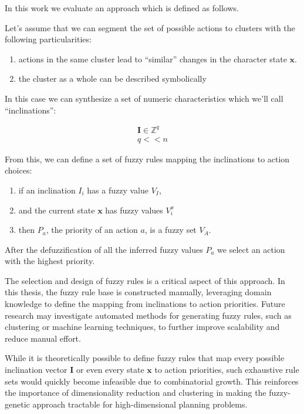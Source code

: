 \documentclass[11pt, a4paper]{article}
\begin{document}
	In this work we evaluate an approach which is defined as follows.
	
	Let's assume that we can segment the set of possible actions to clusters with the following particularities:
	
	\begin{enumerate}
		\item actions in the same cluster lead to ``similar'' changes in the character state $\mathbf{x}$.
		\item the cluster as a whole can be described symbolically
	\end{enumerate}
	
	In this case we can synthesize a set of numeric characteristics which we'll call ``inclinations'':
	
	\begin{eqnarray}
		\mathbf{I} \in \mathbb{Z}^q\\
		q << n \label{q<<n}
	\end{eqnarray}

	From this, we can define a set of fuzzy rules\cite{ray2014softcomputing} mapping the inclinations to action choices:

	\begin{enumerate}
		\item if an inclination $I_i$ has a fuzzy value $V_I$,
		\item and the current state $\mathbf{x}$ has fuzzy values $V^x_i$
		\item then $P_a$, the priority of an action $a$, is a fuzzy set $V_A$.
	\end{enumerate}
	
	After the defuzzification of all the inferred fuzzy values $P_a$ we select an action with the highest priority.
	
	The selection and design of fuzzy rules is a critical aspect of this approach.
	In this thesis, the fuzzy rule base is constructed manually, leveraging domain knowledge to define the mapping from inclinations to action priorities.
	Future research may investigate automated methods for generating fuzzy rules, such as clustering or machine learning techniques, to further improve scalability and reduce manual effort.

	While it is theoretically possible to define fuzzy rules that map every possible inclination vector $\mathbf{I}$ or even every state $\mathbf{x}$ to action priorities, such exhaustive rule sets would quickly become infeasible due to combinatorial growth.
	This reinforces the importance of dimensionality reduction and clustering in making the fuzzy-genetic approach tractable for high-dimensional planning problems.
\end{document}
